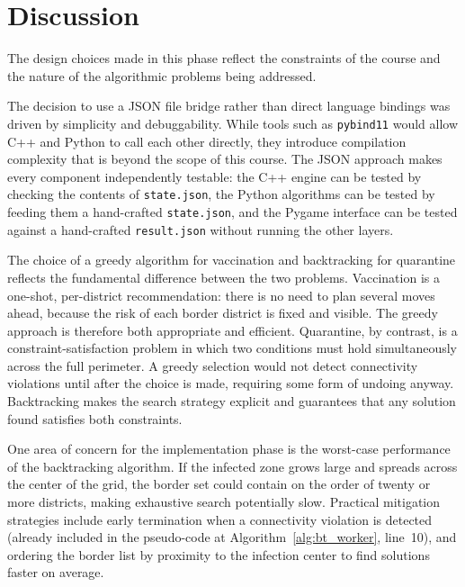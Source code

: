 \documentclass[12pt, a4paper]{article}
\begin{document}
\section{Discussion}

The design choices made in this phase reflect the constraints of the course
and the nature of the algorithmic problems being addressed.

The decision to use a JSON file bridge rather than direct language bindings
was driven by simplicity and debuggability. While tools such as
\texttt{pybind11} would allow C++ and Python to call each other directly,
they introduce compilation complexity that is beyond the scope of this
course. The JSON approach makes every component independently testable:
the C++ engine can be tested by checking the contents of
\texttt{state.json}, the Python algorithms can be tested by feeding them
a hand-crafted \texttt{state.json}, and the Pygame interface can be tested
against a hand-crafted \texttt{result.json} without running the other
layers.

The choice of a greedy algorithm for vaccination and backtracking for
quarantine reflects the fundamental difference between the two problems.
Vaccination is a one-shot, per-district recommendation: there is no need
to plan several moves ahead, because the risk of each border district is
fixed and visible. The greedy approach is therefore both appropriate and
efficient. Quarantine, by contrast, is a constraint-satisfaction problem
in which two conditions must hold simultaneously across the full perimeter.
A greedy selection would not detect connectivity violations until after the
choice is made, requiring some form of undoing anyway. Backtracking makes
the search strategy explicit and guarantees that any solution found
satisfies both constraints.

One area of concern for the implementation phase is the worst-case
performance of the backtracking algorithm. If the infected zone grows
large and spreads across the center of the grid, the border set could
contain on the order of twenty or more districts, making exhaustive search
potentially slow. Practical mitigation strategies include early termination
when a connectivity violation is detected (already included in the
pseudo-code at Algorithm~\ref{alg:bt_worker}, line~10), and ordering the
border list by proximity to the infection center to find solutions faster
on average.

\end{document}
